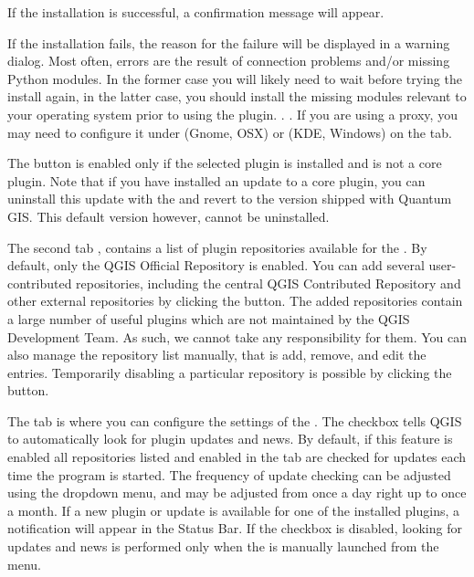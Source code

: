 If the installation is successful, a confirmation message will appear.

If the installation fails, the reason for the failure will be displayed
in a warning dialog. Most often, errors are the result of connection problems
and/or missing Python modules. In the former case you will likely need to
wait before trying the install again, in the latter case, you should install
the missing modules relevant to your operating system prior to using the
plugin. . . If you are using a proxy, you may need to configure it under
 \arrow {} (Gnome, OSX)
or  \arrow {} (KDE, Windows)
on the  tab.

The  button is enabled only if the selected plugin is installed and is not a core plugin. Note that if you have installed an update to a core plugin, you can uninstall this update with the  and revert to the version shipped with Quantum GIS. This default version however, cannot be uninstalled.


The second tab , contains a list of plugin repositories available for the . By default, only the QGIS Official Repository is enabled. You can add several user-contributed repositories, including the central QGIS Contributed Repository and other external repositories by clicking the  button. The added repositories contain a large number of useful plugins which are not maintained by the QGIS Development Team. As such, we cannot take any responsibility for them. You can also manage the repository list manually, that is add, remove, and edit the entries. Temporarily disabling a particular repository is possible by clicking the  button.


The  tab is where you can configure the settings of the . The  checkbox tells QGIS to automatically look for plugin updates and news. By default, if this feature is enabled all repositories listed and enabled in the  tab are checked for updates each time the program is started. The frequency of update checking can be adjusted using the dropdown menu, and may be adjusted from once a day right up to once a month. If a new plugin or update is available for one of the installed plugins, a notification will appear in the Status Bar. If the checkbox is disabled, looking for updates and news is performed only when the  is manually launched from the menu.

